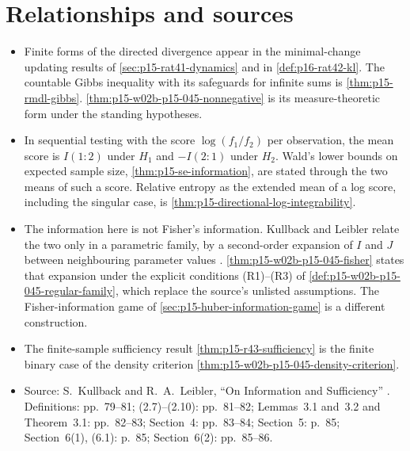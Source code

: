 \section{Relationships and sources}
\label{sec:p15-w02b-p15-045-relations}

\begin{itemize}
\item Finite forms of the directed divergence appear in the
minimal-change updating results of \cref{sec:p15-rat41-dynamics} and in
\cref{def:p16-rat42-kl}. The countable Gibbs inequality with its
safeguards for infinite sums is \cref{thm:p15-rmdl-gibbs}.
\cref{thm:p15-w02b-p15-045-nonnegative} is its measure-theoretic form
under the standing hypotheses.
\item In sequential testing with the score \(\log(f_1/f_2)\) per
observation, the mean score is \(I(1:2)\) under \(H_1\) and \(-I(2:1)\)
under \(H_2\). Wald's lower bounds on expected sample size,
\cref{thm:p15-se-information}, are stated through the two means of such
a score. Relative entropy as the extended mean of a
log score, including the singular case, is
\cref{thm:p15-directional-log-integrability}.
\item The information here is not Fisher's information. Kullback and
Leibler relate the two only in a parametric family, by a second-order
expansion of \(I\) and \(J\) between neighbouring parameter values
\cite[p.~81, eqs.~(2.7)--(2.9)]{KullbackLeibler1951Information}.
\cref{thm:p15-w02b-p15-045-fisher} states that expansion under the
explicit conditions (R1)--(R3) of
\cref{def:p15-w02b-p15-045-regular-family}, which replace the source's
unlisted assumptions. The Fisher-information game of
\cref{sec:p15-huber-information-game} is a different construction.
\item The finite-sample sufficiency result
\cref{thm:p15-r43-sufficiency} is the finite binary case of the
density criterion \cref{thm:p15-w02b-p15-045-density-criterion}.
\item Source: S.~Kullback and R.~A.~Leibler, ``On Information and
Sufficiency'' \cite[pp.~79--86]{KullbackLeibler1951Information}.
Definitions: pp.~79--81; (2.7)--(2.10): pp.~81--82; Lemmas~3.1
and~3.2 and Theorem~3.1: pp.~82--83; Section~4: pp.~83--84; Section~5:
p.~85; Section~6(1), (6.1): p.~85; Section~6(2): pp.~85--86.
\end{itemize}
